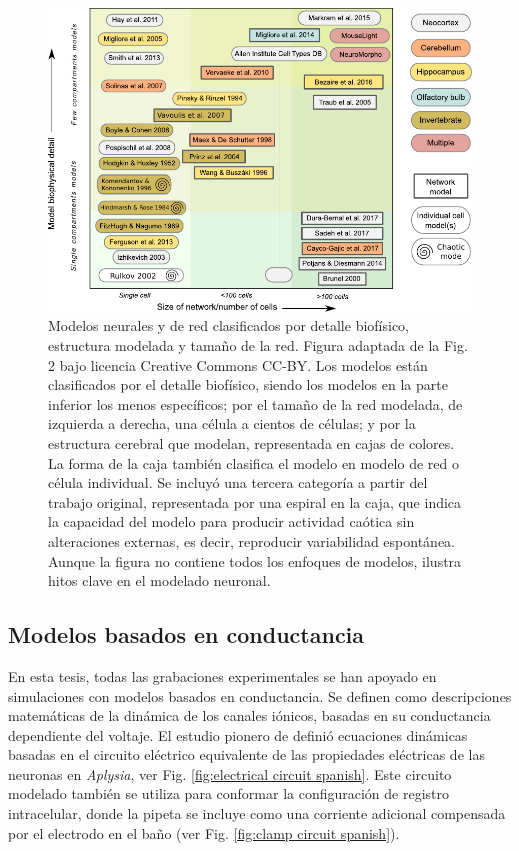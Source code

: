 \begin{figure}[bth!]
\centering
\includegraphics[width=\textwidth]{img/intro/models classification_v2.pdf}
\caption{Modelos neurales y de red clasificados por detalle biofísico, estructura modelada y tamaño de la red. Figura adaptada de la Fig. 2 \cite{gleeson_open_2019} bajo licencia Creative Commons CC-BY. Los modelos están clasificados por el detalle biofísico, siendo los modelos en la parte inferior los menos específicos; por el tamaño de la red modelada, de izquierda a derecha, una célula a cientos de células; y por la estructura cerebral que modelan, representada en cajas de colores. La forma de la caja también clasifica el modelo en modelo de red o célula individual. Se incluyó una tercera categoría a partir del trabajo original, representada por una espiral en la caja, que indica la capacidad del modelo para producir actividad caótica sin alteraciones externas, es decir, reproducir variabilidad espontánea. Aunque la figura no contiene todos los enfoques de modelos, ilustra hitos clave en el modelado neuronal.}
\label{fig:models-classification spanish}
\end{figure}

\subsection{Modelos basados en conductancia}

En esta tesis, todas las grabaciones experimentales se han apoyado en simulaciones con modelos basados en conductancia. Se definen como descripciones matemáticas de la dinámica de los canales iónicos, basadas en su conductancia dependiente del voltaje. El estudio pionero de \cite{hodgkin_quantitative_1952} definió ecuaciones dinámicas basadas en el circuito eléctrico equivalente de las propiedades eléctricas de las neuronas en \textit{Aplysia}, ver Fig. \ref{fig:electrical circuit spanish}. Este circuito modelado también se utiliza para conformar la configuración de registro intracelular, donde la pipeta se incluye como una corriente adicional compensada por el electrodo en el baño (ver Fig. \ref{fig:clamp circuit spanish}).

